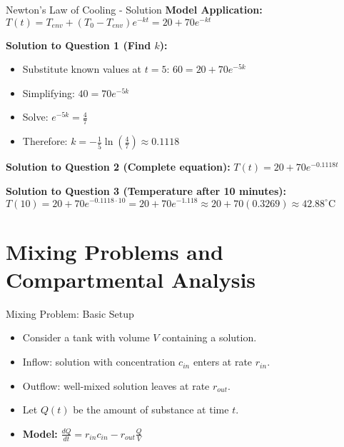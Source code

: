\documentclass[10pt,aspectratio=169]{beamer}
\begin{document}
\begin{frame}{Newton's Law of Cooling - Solution}
    \textbf{Model Application:} $T(t) = T_{env} + (T_0 - T_{env})e^{-kt} = 20 + 70e^{-kt}$
    
    \textbf{Solution to Question 1 (Find $k$):}
    \begin{itemize}
        \item Substitute known values at $t=5$: $60 = 20 + 70e^{-5k}$
        \item Simplifying: $40 = 70e^{-5k}$
        \item Solve: $e^{-5k} = \frac{4}{7}$
        \item Therefore: $k = -\frac{1}{5}\ln\left(\frac{4}{7}\right) \approx 0.1118$
    \end{itemize}
    
    \textbf{Solution to Question 2 (Complete equation):}
    $T(t) = 20 + 70e^{-0.1118t}$
    
    \textbf{Solution to Question 3 (Temperature after 10 minutes):}
    $T(10) = 20 + 70e^{-0.1118 \cdot 10} = 20 + 70e^{-1.118} \approx 20 + 70(0.3269) \approx 42.88^{\circ}\text{C}$
\end{frame}

\section{Mixing Problems and Compartmental Analysis}
\begin{frame}{Mixing Problem: Basic Setup}
    \begin{itemize}
        \item Consider a tank with volume $V$ containing a solution.
        \item Inflow: solution with concentration $c_{in}$ enters at rate $r_{in}$.
        \item Outflow: well-mixed solution leaves at rate $r_{out}$.
        \item Let $Q(t)$ be the amount of substance at time $t$.
        \item \textbf{Model:} $\frac{dQ}{dt} = r_{in}c_{in} - r_{out}\frac{Q}{V}$
    \end{itemize}
\end{frame}

\end{document}

